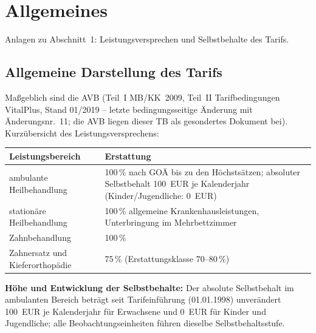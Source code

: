 
\section{Allgemeines}\label{sec:anlagenteil1}

Anlagen zu Abschnitt~1: Leistungsversprechen und Selbstbehalte des
Tarifs.

\subsection{Allgemeine Darstellung des Tarifs}\label{sec:anlage1}

Maßgeblich sind die AVB (Teil~I MB/KK~2009, Teil~II Tarifbedingungen
VitalPlus, Stand 01/2019 -- letzte bedingungsseitige Änderung mit
Änderungsnr.~11; die AVB liegen dieser TB als gesondertes Dokument
bei). Kurzübersicht des Leistungsversprechens:

\begin{center}\small
\begin{tabular}{@{}lp{9.5cm}@{}}
\toprule
Leistungsbereich & Erstattung \\
\midrule
ambulante Heilbehandlung & 100\,\% nach GOÄ bis zu den Höchstsätzen; absoluter Selbstbehalt 100~EUR je Kalenderjahr (Kinder/Jugendliche: 0~EUR) \\
stationäre Heilbehandlung & 100\,\% allgemeine Krankenhausleistungen, Unterbringung im Mehrbettzimmer \\
Zahnbehandlung & 100\,\% \\
Zahnersatz und Kieferorthopädie & 75\,\% (Erstattungsklasse 70--80\,\%) \\
\bottomrule
\end{tabular}
\end{center}

\textbf{Höhe und Entwicklung der Selbstbehalte:} Der absolute
Selbstbehalt im ambulanten Bereich beträgt seit Tarifeinführung
(01.01.1998) unverändert 100~EUR je Kalenderjahr für Erwachsene und
0~EUR für Kinder und Jugendliche; alle Beobachtungseinheiten führen
dieselbe Selbstbehaltsstufe.

